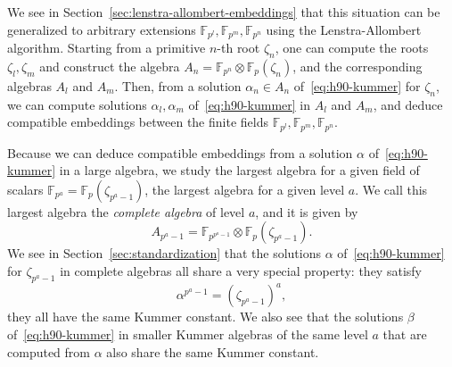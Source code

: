 We see in Section~\ref{sec:lenstra-allombert-embeddings} that this situation can
be generalized to arbitrary extensions $\mathbb{F}_{p^{l}}, \mathbb{F}_{p^{m}},
\mathbb{F}_{p^{n}}$ using the Lenstra-Allombert algorithm. Starting from a
primitive $n$-th root $\zeta_n$, one can compute the roots $\zeta_l, \zeta_m$
and construct the algebra $A_n =
\mathbb{F}_{p^{n}}\otimes\mathbb{F}_{p}(\zeta_n)$, and the corresponding
algebras $A_l$ and $A_m$. Then, from a solution $\alpha_n\in A_n$
of~\eqref{eq:h90-kummer} for $\zeta_n$, we can compute solutions $\alpha_l,
\alpha_m$ of~\eqref{eq:h90-kummer} in $A_l$ and $A_m$, and deduce compatible
embeddings between the finite fields $\mathbb{F}_{p^{l}},
\mathbb{F}_{p^{m}}, \mathbb{F}_{p^{n}}$.
\begin{center}
\end{center}
Because we can deduce compatible embeddings from a solution $\alpha$
of~\eqref{eq:h90-kummer} in a large algebra, we study the largest algebra for a
given field of scalars $\mathbb{F}_{p^{a}}=\mathbb{F}_p(\zeta_{p^a-1})$, \ie the
largest algebra for a given level $a$.
We call this largest algebra the \emph{complete algebra} of level $a$, and it is
given by
\[
  A_{p^a-1} = \mathbb{F}_{p^{p^a-1}}\otimes \mathbb{F}_p(\zeta_{p^a-1}).
\]
We see in Section~\ref{sec:standardization} that the solutions $\alpha$
of~\eqref{eq:h90-kummer} for $\zeta_{p^a-1}$ in complete algebras all share a
very special property: they satisfy
\[
  \alpha^{p^a-1} = (\zeta_{p^a-1})^a,
\]
\ie they all have the same Kummer constant. We also see that the solutions
$\beta$ of~\eqref{eq:h90-kummer} in smaller Kummer algebras of the same level
$a$ that are computed from $\alpha$ also share the same Kummer constant.
